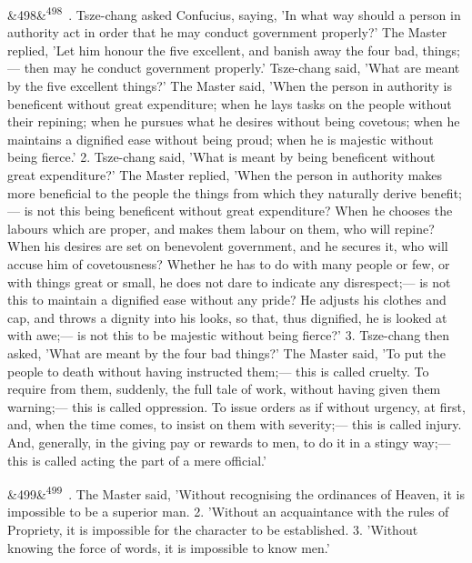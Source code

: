 \documentclass[12pt]{article}
\newcommand{\para}[1][]{\par\noindent\ifx&#1&\else\textsuperscript{\footnotesize #1}~\fi}
\begin{document}
\para[498] 1. Tsze-chang asked Confucius, saying, 'In what way should a person in authority act in order that he may conduct government properly?' The Master replied, 'Let him honour the five excellent, and banish away the four bad, things;--- then may he conduct government properly.' Tsze-chang said, 'What are meant by the five excellent things?' The Master said, 'When the person in authority is beneficent without great expenditure; when he lays tasks on the people without their repining; when he pursues what he desires without being covetous; when he maintains a dignified ease without being proud; when he is majestic without being fierce.' 2. Tsze-chang said, 'What is meant by being beneficent without great expenditure?' The Master replied, 'When the person in authority makes more beneficial to the people the things from which they naturally derive benefit;--- is not this being beneficent without great expenditure? When he chooses the labours which are proper, and makes them labour on them, who will repine? When his desires are set on benevolent government, and he secures it, who will accuse him of covetousness? Whether he has to do with many people or few, or with things great or small, he does not dare to indicate any disrespect;--- is not this to maintain a dignified ease without any pride? He adjusts his clothes and cap, and throws a dignity into his looks, so that, thus dignified, he is looked at with awe;--- is not this to be majestic without being fierce?' 3. Tsze-chang then asked, 'What are meant by the four bad things?' The Master said, 'To put the people to death without having instructed them;--- this is called cruelty. To require from them, suddenly, the full tale of work, without having given them warning;--- this is called oppression. To issue orders as if without urgency, at first, and, when the time comes, to insist on them with severity;--- this is called injury. And, generally, in the giving pay or rewards to men, to do it in a stingy way;--- this is called acting the part of a mere official.'

\para[499] 1. The Master said, 'Without recognising the ordinances of Heaven, it is impossible to be a superior man. 2. 'Without an acquaintance with the rules of Propriety, it is impossible for the character to be established. 3. 'Without knowing the force of words, it is impossible to know men.'

\end{document}
